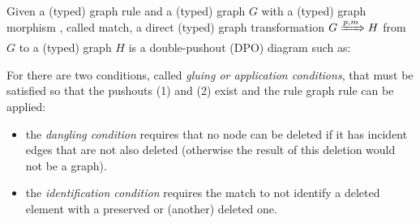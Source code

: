 \begin{definition} Given a (typed) graph rule \graphrule{} and a (typed) graph $G$ with a (typed) graph morphism \match, called match, a direct (typed) graph transformation $G \xRightarrow{p,m} H$ from $G$ to a (typed) graph $H$ is a double-pushout (DPO) diagram such as:


  For  there are two conditions, called \emph{gluing or application conditions}, that must be satisfied so that the pushouts (1) and (2) exist and the rule graph rule can be applied:

\begin{itemize}
  \item the \emph{dangling condition} requires that no node can be deleted if it has incident edges that are not also deleted (otherwise the result of this deletion would not be a graph).  
  \item the \emph{identification condition} requires the match to not identify a deleted element with a preserved or (another) deleted one.
\end{itemize}

\end{definition}

